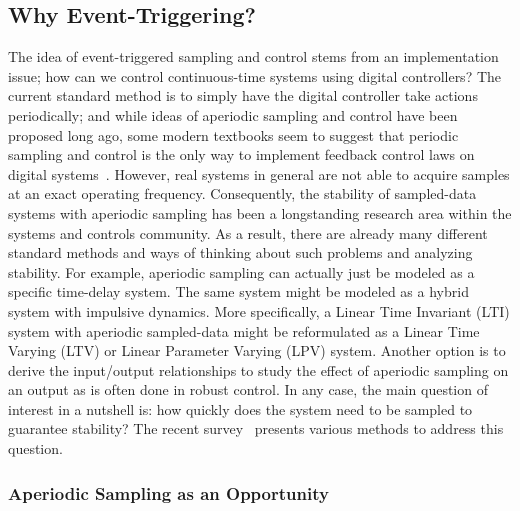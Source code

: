 \documentclass{autart}
\begin{document}
\subsection*{Why Event-Triggering?}

The idea of event-triggered sampling and control stems from an
implementation issue; how can we control continuous-time systems using
digital controllers? The current standard method is to simply have the
digital controller take actions periodically; and while ideas of
aperiodic sampling and control have been proposed long ago, some
modern textbooks seem to suggest that periodic sampling and control is
the only way to implement feedback control laws on digital
systems~\citep{KJA-BW:97,GF-JP-AE:10,WPMHH-KHJ-PT:12}.  However, real
systems in general are not able to acquire samples at an exact
operating frequency. Consequently, the stability of sampled-data
systems with aperiodic sampling has been a longstanding research area
within the systems and controls community.  As a result, there are
already many different standard methods and ways of thinking about
such problems and analyzing stability. For example, aperiodic sampling
can actually just be modeled as a specific time-delay system. The same
system might be modeled as a hybrid system with impulsive
dynamics. More specifically, a Linear Time Invariant (LTI) system with
aperiodic sampled-data might be reformulated as a Linear Time Varying
(LTV) or Linear Parameter Varying (LPV) system. Another option is to
derive the input/output relationships to study the effect of aperiodic
sampling on an output as is often done in robust control. In any case,
the main question of interest in a nutshell is: how quickly does the
system need to be sampled to guarantee stability? The recent
survey~\citep{LH-CF-HO-AS-EF-JR-SIN:17} presents various methods to
address this question.

\subsubsection*{Aperiodic Sampling as an Opportunity}
\end{document}
